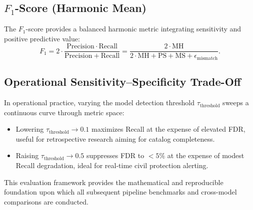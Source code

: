 \subsection{$F_1$-Score (Harmonic Mean)}
The $F_1$-score provides a balanced harmonic metric integrating sensitivity and positive predictive value:
\begin{equation}
  F_1 = 2 \cdot \frac{\mathrm{Precision} \cdot \mathrm{Recall}}{\mathrm{Precision} + \mathrm{Recall}} = \frac{2 \cdot \mathrm{MH}}{2 \cdot \mathrm{MH} + \mathrm{PS} + \mathrm{MS} + \epsilon_{\mathrm{mismatch}}}.
\end{equation}

\subsection{Operational Sensitivity--Specificity Trade-Off}
In operational practice, varying the model detection threshold $\tau_{\mathrm{threshold}}$ sweeps a continuous curve through metric space:
\begin{itemize}
  \item Lowering $\tau_{\mathrm{threshold}} \to 0.1$ maximizes Recall at the expense of elevated FDR, useful for retrospective research aiming for catalog completeness.
  \item Raising $\tau_{\mathrm{threshold}} \to 0.5$ suppresses FDR to $< 5\%$ at the expense of modest Recall degradation, ideal for real-time civil protection alerting.
\end{itemize}

This evaluation framework provides the mathematical and reproducible foundation upon which all subsequent pipeline benchmarks and cross-model comparisons are conducted.
